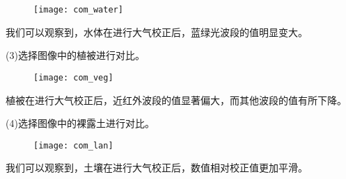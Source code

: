 \documentclass[12pt,a4paper]{article}
\begin{document}
	\begin{figure}[H]
		\centering
		\texttt{[image: com\_water]}
	\end{figure}
	\begin{shaded}
		我们可以观察到，水体在进行大气校正后，蓝绿光波段的值明显变大。
	\end{shaded}
	(3)选择图像中的植被进行对比。
	
	\begin{figure}[H]
		\centering
		\texttt{[image: com\_veg]}
	\end{figure}
	\begin{shaded}
		植被在进行大气校正后，近红外波段的值显著偏大，而其他波段的值有所下降。
	\end{shaded}
	
	
	(4)选择图像中的裸露土进行对比。
	
	\begin{figure}[H]
		\centering
		\texttt{[image: com\_lan]}
	\end{figure}
	\begin{shaded}
		我们可以观察到，土壤在进行大气校正后，数值相对校正值更加平滑。
	\end{shaded}
	
\end{document}
